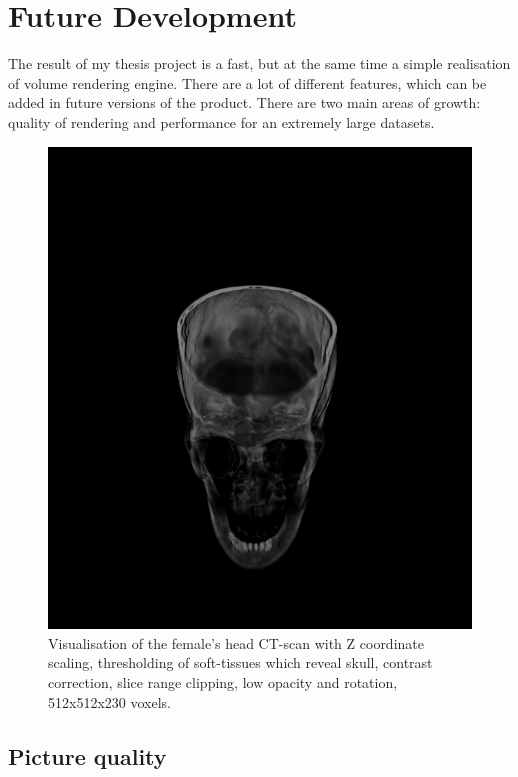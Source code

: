 \documentclass[twoside, english, 11pt]{report}
\begin{document}

\section{Future Development}

The result of my thesis project is a fast, but at the same time a simple realisation of volume rendering engine. There are a lot of different features, which can be added in future versions of the product. There are two main areas of growth: quality of rendering and performance for an extremely large datasets.\\

\begin{figure}[H]
\centerline{\includegraphics[scale = 0.7]{img/head-all}}
\caption{Visualisation of the female's head CT-scan with Z coordinate scaling, thresholding of soft-tissues which reveal skull, contrast correction, slice range clipping, low opacity and rotation, 512x512x230 voxels.\label{fig:head-all}}
\end{figure}

\subsection{Picture quality}
\end{document}
